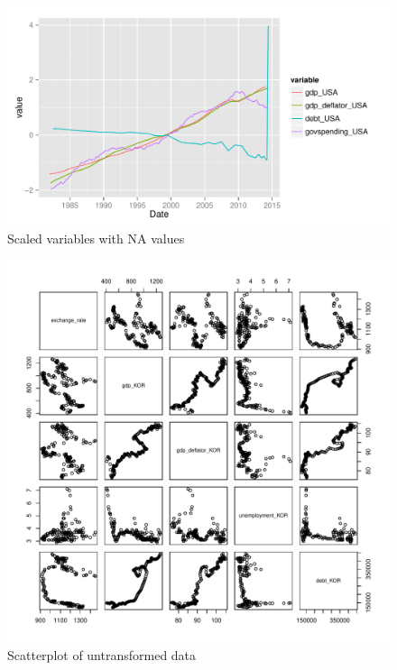 \documentclass[12pt]{article}
\begin{document}
\begin{figure}
  \centering
    \includegraphics{na_plot_USA.pdf}
  \caption{Scaled variables with NA values}
  \label{fig:na_plot_USA}
\end{figure}

\begin{figure}
  \centering
    \includegraphics{scatterplot.pdf}
  \caption{Scatterplot of untransformed data}
  \label{fig:scatterplot}
\end{figure}
\end{document}
